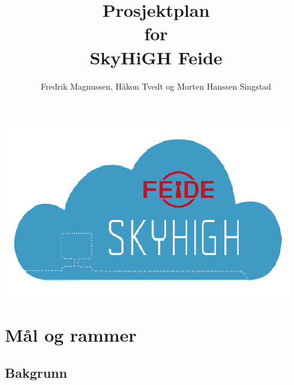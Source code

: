 \documentclass[12pt,a4paper]{article}
\begin{document}
\title{Prosjektplan \\ for \\ SkyHiGH Feide}
\author{Fredrik Magnussen, Håkon Tvedt og Morten Hanssen Singstad}
\maketitle
\begin{center}
	\includegraphics[scale=1]{logo.png}
\end{center}

\newpage
\tableofcontents

\newpage
\section{Mål og rammer}
\subsection{Bakgrunn}
\end{document}
